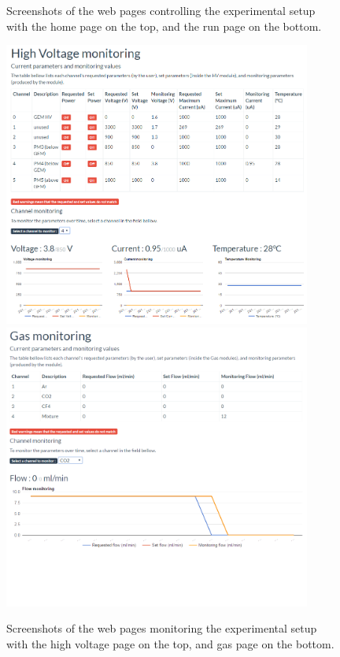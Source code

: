 \begin{figure}[p!]
        \caption{Screenshots of the web pages controlling the experimental setup with the home page on the top, and the run page on the bottom.}
        \label{fig:III-1-app-control}
      \end{figure}

      \begin{figure}[p!]
        \centering
        \includegraphics[width=0.9\textwidth]{img/III-1-arch/app-hv.png} \\
        \vspace*{0.5cm}
        \includegraphics[width=0.9\textwidth]{img/III-1-arch/app-gas.png}
        \caption{Screenshots of the web pages monitoring the experimental setup with the high voltage page on the top, and gas page on the bottom.}
        \label{fig:III-1-app-monitor}
      \end{figure}

